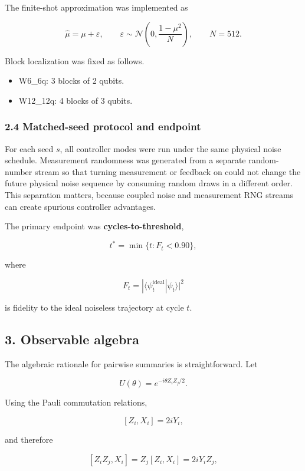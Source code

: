 \documentclass[
]{article}
\providecommand{\tightlist}{%
  \setlength{\itemsep}{0pt}\setlength{\parskip}{0pt}}
\begin{document}
The finite-shot approximation was implemented as

\[
\hat{\mu} = \mu + \varepsilon, \qquad
\varepsilon \sim \mathcal{N}\left(0, \frac{1-\mu^2}{N}\right), \qquad N=512.
\]

Block localization was fixed as follows.

\begin{itemize}
\tightlist
\item
  W6\_6q: 3 blocks of 2 qubits.
\item
  W12\_12q: 4 blocks of 3 qubits.
\end{itemize}

\subsubsection{2.4 Matched-seed protocol and
endpoint}\label{matched-seed-protocol-and-endpoint}

For each seed \(s\), all controller modes were run under the same
physical noise schedule. Measurement randomness was generated from a
separate random-number stream so that turning measurement or feedback on
could not change the future physical noise sequence by consuming random
draws in a different order. This separation matters, because coupled
noise and measurement RNG streams can create spurious controller
advantages.

The primary endpoint was \textbf{cycles-to-threshold},

\[
t^* = \min \{ t : F_t < 0.90 \},
\]

where

\[
F_t = |\langle \psi_t^{\mathrm{ideal}} | \psi_t \rangle|^2
\]

is fidelity to the ideal noiseless trajectory at cycle \(t\).

\subsection{3. Observable algebra}\label{observable-algebra}

The algebraic rationale for pairwise summaries is straightforward. Let

\[
U(\theta) = e^{-i\theta Z_i Z_j / 2}.
\]

Using the Pauli commutation relations,

\[
[Z_i, X_i] = 2iY_i,
\]

and therefore

\[
[Z_i Z_j, X_i] = Z_j[Z_i,X_i] = 2i Y_i Z_j,
\]
\end{document}
